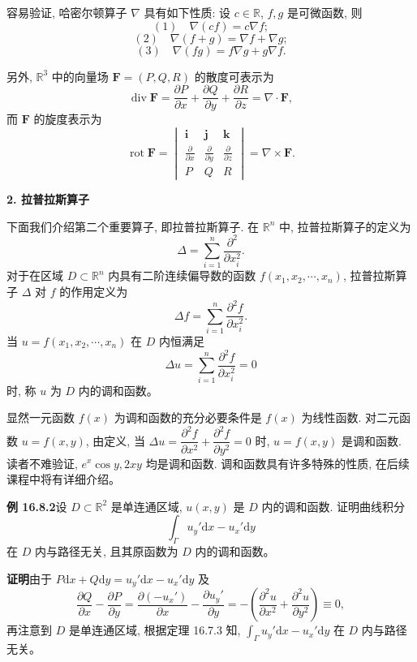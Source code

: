 \documentclass[UTF8, 12pt, fontset=fandol, oneside]{ctexart}
\begin{document}
容易验证, 哈密尔顿算子 $\nabla$ 具有如下性质: 设 $c\in\mathbb R$, $f,g$ 是可微函数, 则
\[
  (1)\quad \nabla(cf)=c\nabla f;
\]
\[
  (2)\quad \nabla(f+g)=\nabla f+\nabla g;
\]
\[
  (3)\quad \nabla(fg)=f\nabla g+g\nabla f.
\]

另外, $\mathbb R^3$ 中的向量场 $\boldsymbol F=(P,Q,R)$ 的散度可表示为
\[
  \operatorname{div}\boldsymbol F
  =
  \frac{\partial P}{\partial x}+\frac{\partial Q}{\partial y}+\frac{\partial R}{\partial z}
  =
  \nabla\cdot\boldsymbol F,
\]
而 $\boldsymbol F$ 的旋度表示为
\[
  \operatorname{rot}\boldsymbol F
  =
  \begin{vmatrix}
    \boldsymbol i&\boldsymbol j&\boldsymbol k\\
    \frac{\partial}{\partial x}&\frac{\partial}{\partial y}&\frac{\partial}{\partial z}\\
    P&Q&R
  \end{vmatrix}
  =
  \nabla\times\boldsymbol F.
\]

\noindent\textbf{2. 拉普拉斯算子}

下面我们介绍第二个重要算子, 即拉普拉斯算子. 在 $\mathbb R^n$ 中, 拉普拉斯算子的定义为
\[
  \Delta=\sum_{i=1}^n\frac{\partial^2}{\partial x_i^2}.
\]
对于在区域 $D\subset\mathbb R^n$ 内具有二阶连续偏导数的函数 $f(x_1,x_2,\cdots,x_n)$, 拉普拉斯算子 $\Delta$ 对 $f$ 的作用定义为
\[
  \Delta f=\sum_{i=1}^n\frac{\partial^2f}{\partial x_i^2}.
\]
当 $u=f(x_1,x_2,\cdots,x_n)$ 在 $D$ 内恒满足
\[
  \Delta u=\sum_{i=1}^n\frac{\partial^2f}{\partial x_i^2}=0
\]
时, 称 $u$ 为 $D$ 内的调和函数。

显然一元函数 $f(x)$ 为调和函数的充分必要条件是 $f(x)$ 为线性函数. 对二元函数 $u=f(x,y)$, 由定义, 当 $\Delta u=\dfrac{\partial^2f}{\partial x^2}+\dfrac{\partial^2f}{\partial y^2}=0$ 时, $u=f(x,y)$ 是调和函数. 读者不难验证, $e^x\cos y,2xy$ 均是调和函数. 调和函数具有许多特殊的性质, 在后续课程中将有详细介绍。

\noindent\textbf{例 16.8.2}\quad 设 $D\subset\mathbb R^2$ 是单连通区域, $u(x,y)$ 是 $D$ 内的调和函数. 证明曲线积分
\[
  \int_\Gamma u_y'\mathrm dx-u_x'\mathrm dy
\]
在 $D$ 内与路径无关, 且其原函数为 $D$ 内的调和函数。

\noindent\textbf{证明}\quad 由于 $P\mathrm dx+Q\mathrm dy=u_y'\mathrm dx-u_x'\mathrm dy$ 及
\[
  \frac{\partial Q}{\partial x}-\frac{\partial P}{\partial y}
  =
  \frac{\partial(-u_x')}{\partial x}-\frac{\partial u_y'}{\partial y}
  =
  -\left(\frac{\partial^2u}{\partial x^2}+\frac{\partial^2u}{\partial y^2}\right)
  \equiv0,
\]
再注意到 $D$ 是单连通区域, 根据定理 16.7.3 知, $\int_\Gamma u_y'\mathrm dx-u_x'\mathrm dy$ 在 $D$ 内与路径无关。
\end{document}
